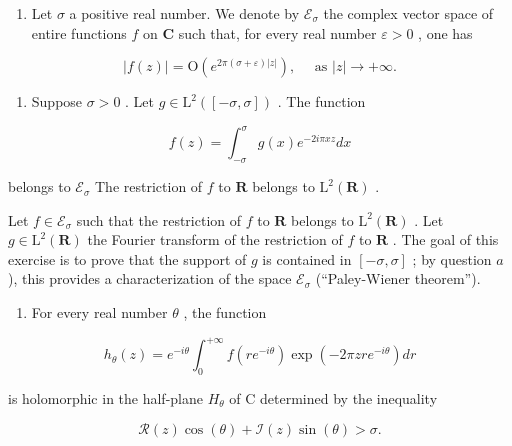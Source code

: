 \begin{enumerate}
\def\labelenumi{\arabic{enumi})}
\setcounter{enumi}{35}
\tightlist
\item
  Let \(\sigma\) a positive real number. We denote by \(\mathcal{E}_{\sigma}\) the complex vector space of entire functions \(f\) on \(\mathbf{C}\) such that, for every real number \(\varepsilon > 0\) , one has
\end{enumerate}

\[
| f (z) | = \mathrm{O} (e ^ {2 \pi (\sigma + \varepsilon) | z |}), \quad \text { as } | z | \to + \infty .
\]

\begin{enumerate}
\def\labelenumi{\alph{enumi})}
\tightlist
\item
  Suppose \(\sigma > 0\) . Let \(g \in \mathrm{L}^2([- \sigma, \sigma])\) . The function
\end{enumerate}

\[
f (z) = \int_ {- \sigma} ^ {\sigma} g (x) e ^ {- 2 i \pi x z} d x
\]

belongs to \(\mathcal{E}_{\sigma}\) The restriction of \(f\) to \(\mathbf{R}\) belongs to \(\mathrm{L}^2 (\mathbf{R})\) .

Let \(f \in \mathcal{E}_{\sigma}\) such that the restriction of \(f\) to \(\mathbf{R}\) belongs to \(\mathrm{L}^2(\mathbf{R})\) . Let \(g \in \mathrm{L}^2(\mathbf{R})\) the Fourier transform of the restriction of \(f\) to \(\mathbf{R}\) . The goal of this exercise is to prove that the support of \(g\) is contained in \([-\sigma, \sigma]\) ; by question \(a\) ), this provides a characterization of the space \(\mathcal{E}_{\sigma}\) (“Paley-Wiener theorem”).

\begin{enumerate}
\def\labelenumi{\alph{enumi})}
\setcounter{enumi}{1}
\tightlist
\item
  For every real number \(\theta\) , the function
\end{enumerate}

\[
h _ {\theta} (z) = e ^ {- i \theta} \int_ {0} ^ {+ \infty} f (r e ^ {- i \theta}) \exp (- 2 \pi z r e ^ {- i \theta}) d r
\]

is holomorphic in the half-plane \(H_{\theta}\) of C determined by the inequality

\[
\mathcal {R} (z) \cos (\theta) + \mathcal {I} (z) \sin (\theta) > \sigma .
\]

